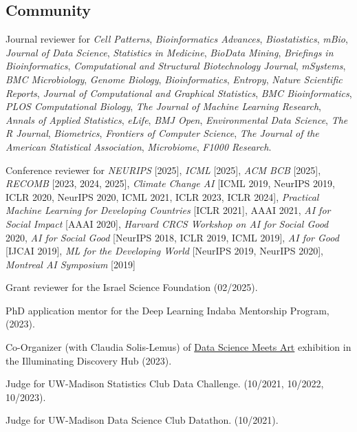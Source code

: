 \documentclass[letterpaper]{article}
\renewenvironment{itemize}{
  \begin{list}{}{
    \setlength{\leftmargin}{1.5em}
  }
}{
  \end{list}
}
\begin{document}
\subsection*{Community}

\begin{itemize}
\item Journal reviewer for \textit{Cell Patterns}, \textit{Bioinformatics
Advances}, \textit{Biostatistics}, \textit{mBio}, \textit{Journal of Data
Science}, \textit{Statistics in Medicine}, \textit{BioData Mining},
\textit{Briefings in Bioinformatics}, \textit{Computational and Structural
Biotechnology Journal}, \textit{mSystems}, \textit{BMC Microbiology},
\textit{Genome Biology}, \textit{Bioinformatics}, \textit{Entropy},
\textit{Nature Scientific Reports}, \textit{Journal of Computational and
Graphical Statistics}, \textit{BMC Bioinformatics}, \textit{PLOS Computational
Biology}, \textit{The Journal of Machine Learning Research}, \textit{Annals of
Applied Statistics}, \textit{eLife}, \textit{BMJ Open}, \textit{Environmental
Data Science}, \textit{The R Journal}, \textit{Biometrics}, \textit{Frontiers of
Computer Science}, \textit{The Journal of the American Statistical Association},
\textit{Microbiome}, \textit{F1000 Research}.
\item Conference reviewer for \textit{NEURIPS} [2025], \textit{ICML} [2025],
\textit{ACM BCB} [2025], \textit{RECOMB} [2023, 2024, 2025], \textit{Climate
Change AI} [ICML 2019, NeurIPS 2019, ICLR 2020, NeurIPS 2020, ICML 2021, ICLR
2023, ICLR 2024], \textit{Practical Machine Learning for Developing Countries}
[ICLR 2021], AAAI 2021, \textit{AI for Social Impact} [AAAI 2020],
\textit{Harvard CRCS Workshop on AI for Social Good} 2020, \textit{AI for Social
Good} [NeurIPS 2018, ICLR 2019, ICML 2019], \textit{AI for Good} [IJCAI 2019],
\textit{ML for the Developing World} [NeurIPS 2019, NeurIPS 2020],
\textit{Montreal AI Symposium} [2019]
\item Grant reviewer for the Israel Science Foundation (02/2025).
\item PhD application mentor for the Deep Learning Indaba Mentorship Program, (2023).
\item Co-Organizer (with Claudia Solis-Lemus) of
\href{https://illuminatingdiscovery.wisc.edu/technical-to-beautiful-data-as-art/}{Data Science Meets Art} exhibition in the Illuminating Discovery Hub (2023).
\item Judge for UW-Madison Statistics Club Data Challenge. (10/2021, 10/2022, 10/2023).
\item Judge for UW-Madison Data Science Club Datathon. (10/2021).

\end{itemize}
\end{document}
